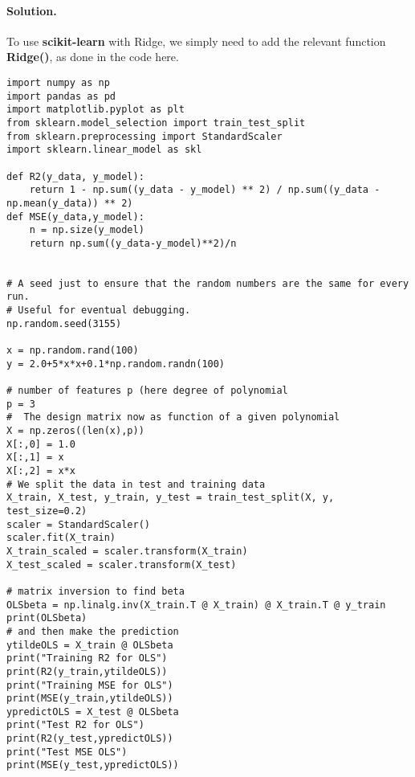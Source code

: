 \documentclass[%
oneside,                 %
final,                   %
10pt]{article}
\newenvironment{doconceexercise}{}{}
\begin{document}
\begin{doconceexercise}
\paragraph{Solution.}
To use \textbf{scikit-learn} with Ridge, we simply need to add the relevant function \textbf{Ridge()}, as done in the code here.
\begin{verbatim}
import numpy as np
import pandas as pd
import matplotlib.pyplot as plt
from sklearn.model_selection import train_test_split
from sklearn.preprocessing import StandardScaler
import sklearn.linear_model as skl

def R2(y_data, y_model):
    return 1 - np.sum((y_data - y_model) ** 2) / np.sum((y_data - np.mean(y_data)) ** 2)
def MSE(y_data,y_model):
    n = np.size(y_model)
    return np.sum((y_data-y_model)**2)/n


# A seed just to ensure that the random numbers are the same for every run.
# Useful for eventual debugging.
np.random.seed(3155)

x = np.random.rand(100)
y = 2.0+5*x*x+0.1*np.random.randn(100)

# number of features p (here degree of polynomial
p = 3
#  The design matrix now as function of a given polynomial
X = np.zeros((len(x),p))
X[:,0] = 1.0
X[:,1] = x
X[:,2] = x*x
# We split the data in test and training data
X_train, X_test, y_train, y_test = train_test_split(X, y, test_size=0.2)
scaler = StandardScaler()
scaler.fit(X_train)
X_train_scaled = scaler.transform(X_train)
X_test_scaled = scaler.transform(X_test)

# matrix inversion to find beta
OLSbeta = np.linalg.inv(X_train.T @ X_train) @ X_train.T @ y_train
print(OLSbeta)
# and then make the prediction
ytildeOLS = X_train @ OLSbeta
print("Training R2 for OLS")
print(R2(y_train,ytildeOLS))
print("Training MSE for OLS")
print(MSE(y_train,ytildeOLS))
ypredictOLS = X_test @ OLSbeta
print("Test R2 for OLS")
print(R2(y_test,ypredictOLS))
print("Test MSE OLS")
print(MSE(y_test,ypredictOLS))


\end{verbatim}
\end{doconceexercise}
\end{document}
